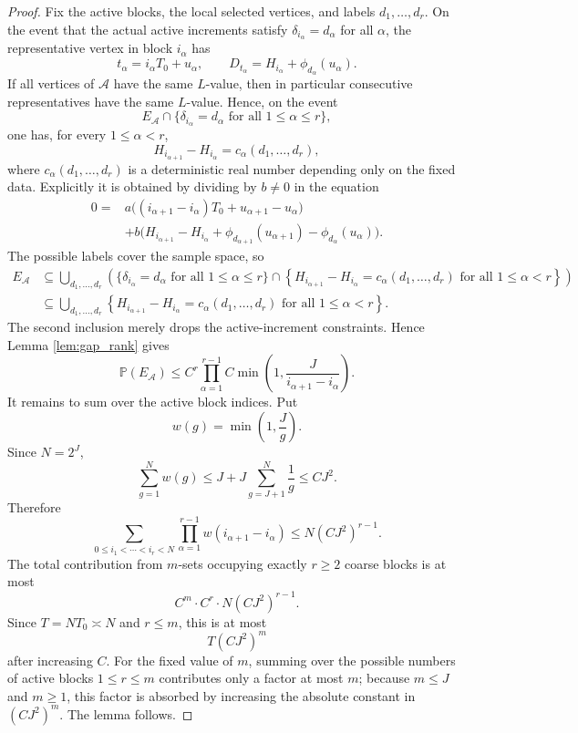 \documentclass[10pt,a4paper]{amsart}
\newcommand{\Pp}{\mathbb P}
\newcommand{\1}{\mathbf 1}
\begin{document}
\begin{proof}
\bigskip
\noindent
Fix the active blocks, the local selected vertices, and labels $d_1,\ldots,d_r$.  On the event that the actual active increments satisfy $\delta_{i_\alpha}=d_\alpha$ for all $\alpha$, the representative vertex in block $i_\alpha$ has
\[
t_\alpha=i_\alpha T_0+u_\alpha,
\qquad
D_{t_\alpha}=H_{i_\alpha}+\phi_{d_\alpha}(u_\alpha).
\]
If all vertices of $\mathcal A$ have the same $L$-value, then in particular consecutive representatives have the same $L$-value.  Hence, on the event
\[
E_\mathcal A\cap
\{\delta_{i_\alpha}=d_\alpha\text{ for all }1\le\alpha\le r\},
\]
one has, for every $1\le\alpha<r$,
\[
H_{i_{\alpha+1}}-H_{i_\alpha}=c_\alpha(d_1,\ldots,d_r),
\]
where $c_\alpha(d_1,\ldots,d_r)$ is a deterministic real number depending only on the fixed data.  Explicitly it is obtained by dividing by $b\ne0$ in the equation
\[
\begin{aligned}
0={}&a\bigl((i_{\alpha+1}-i_\alpha)T_0+u_{\alpha+1}-u_\alpha\bigr)\\
&+b\bigl(H_{i_{\alpha+1}}-H_{i_\alpha}
 +\phi_{d_{\alpha+1}}(u_{\alpha+1})-\phi_{d_\alpha}(u_\alpha)\bigr).
\end{aligned}
\]
The possible labels cover the sample space, so
\[
\begin{aligned}
E_\mathcal A
&\subseteq
\bigcup_{d_1,\ldots,d_r}
\left(
\{\delta_{i_\alpha}=d_\alpha\text{ for all }1\le\alpha\le r\}
\cap
\left\{
H_{i_{\alpha+1}}-H_{i_\alpha}=c_\alpha(d_1,\ldots,d_r)
\text{ for all }1\le\alpha<r
\right\}\right)\\
&\subseteq
\bigcup_{d_1,\ldots,d_r}
\left\{
H_{i_{\alpha+1}}-H_{i_\alpha}=c_\alpha(d_1,\ldots,d_r)
\text{ for all }1\le\alpha<r
\right\}.
\end{aligned}
\]
The second inclusion merely drops the active-increment constraints.  Hence Lemma \ref{lem:gap_rank} gives
\[
\Pp(E_\mathcal A)
\le
C^r
\prod_{\alpha=1}^{r-1}C\min\left(1,\frac{J}{i_{\alpha+1}-i_\alpha}\right).
\]
It remains to sum over the active block indices.  Put
\[
w(g)=\min\left(1,\frac{J}{g}\right).
\]
Since $N=2^J$,
\[
\sum_{g=1}^N w(g)
\le J+J\sum_{g=J+1}^N \frac{1}{g}
\le C J^2.
\]
Therefore
\[
\sum_{0\le i_1<\cdots<i_r<N}
\prod_{\alpha=1}^{r-1}w(i_{\alpha+1}-i_\alpha)
\le
N(CJ^2)^{r-1}.
\]
The total contribution from $m$-sets occupying exactly $r\ge2$ coarse blocks is at most
\[
C^m\cdot C^r\cdot N(CJ^2)^{r-1}.
\]
Since $T=NT_0\asymp N$ and $r\le m$, this is at most
\[
T(CJ^2)^m
\]
after increasing $C$.  For the fixed value of $m$, summing over the possible numbers of active blocks $1\le r\le m$ contributes only a factor at most $m$; because $m\le J$ and $m\ge1$, this factor is absorbed by increasing the absolute constant in $(CJ^2)^m$.  The lemma follows.
\end{proof}
\end{document}
